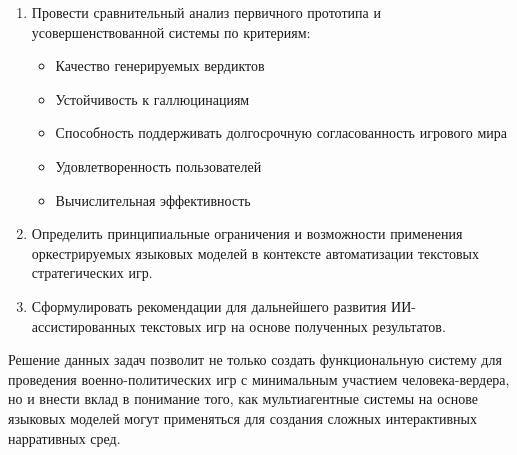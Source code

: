\begin{enumerate}
    \item Провести сравнительный анализ первичного прототипа и усовершенствованной системы по критериям:
    \begin{itemize}
        \item Качество генерируемых вердиктов
        \item Устойчивость к галлюцинациям
        \item Способность поддерживать долгосрочную согласованность игрового мира
        \item Удовлетворенность пользователей
        \item Вычислительная эффективность
    \end{itemize}

    \item Определить принципиальные ограничения и возможности применения оркестрируемых языковых моделей в контексте автоматизации текстовых стратегических игр.

    \item Сформулировать рекомендации для дальнейшего развития ИИ-ассистированных текстовых игр на основе полученных результатов.
\end{enumerate}

Решение данных задач позволит не только создать функциональную систему для проведения военно-политических игр с минимальным участием человека-вердера, но и внести вклад в понимание того, как мультиагентные системы на основе языковых моделей могут применяться для создания сложных интерактивных нарративных сред.
